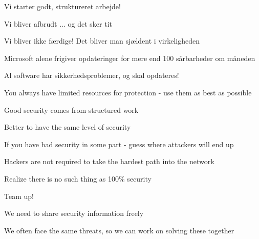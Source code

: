 \documentclass[Screen16to9,17pt]{foils}
\begin{document}

\begin{list2}
\item Vi starter godt, struktureret arbejde!
\item Vi bliver afbrudt ... og det sker tit
\item Vi bliver ikke færdige! Det bliver man sjældent i virkeligheden
\item Microsoft alene frigiver opdateringer for mere end 100 sårbarheder om måneden
\item Al software har sikkerhedsproblemer, og skal opdateres!
\end{list2}




\begin{list1}
\item You always have limited resources for protection - use them as best as possible
\item Good security comes from structured work
\end{list1}




\begin{list1}
\item Better to have the same level of security
\item If you have bad security in some part - guess where attackers will end up
\item Hackers are not required to take the hardest path into the network
\item Realize there is no such thing as 100\% security
\end{list1}





\begin{list1}
\item Team up!
\item We need to share security information freely
\item We often face the same threats, so we can work on solving these together
\end{list1}
\end{document}
